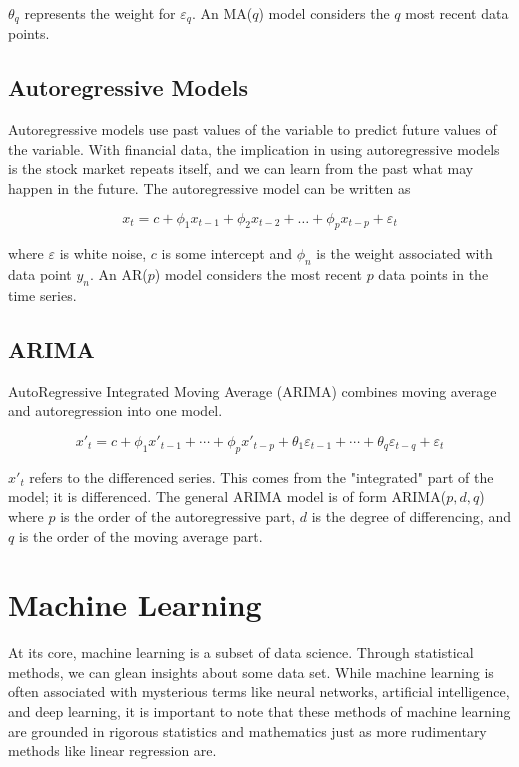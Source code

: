 \documentclass[12pt]{article}
\begin{document}
$\theta_q$ represents the weight for $\varepsilon_q$. An MA($q$) model considers the $q$ most recent data points. \cite[8.4]{forecasting}


\subsection{Autoregressive Models}
Autoregressive models use past values of the variable to predict future values of the variable. With financial data, the implication in using autoregressive models is the stock market repeats itself, and we can learn from the past what may happen in the future. \cite[8.3]{forecasting} The autoregressive model can be written as 

$$x_{t} = c + \phi_{1}x_{t-1} + \phi_{2}x_{t-2} + \dots + \phi_{p}x_{t-p} + \varepsilon_{t}$$

where $\varepsilon$ is white noise, $c$ is some intercept and $\phi_n$ is the weight associated with data point $y_n$. An AR($p$) model considers the most recent $p$ data points in the time series.

\subsection{ARIMA}
AutoRegressive Integrated Moving Average (ARIMA) combines moving average and autoregression into one model. 

$$ x'_{t} = c + \phi_{1}x'_{t-1} + \cdots + \phi_{p}x'_{t-p} + \theta_{1}\varepsilon_{t-1} + \cdots + \theta_{q}\varepsilon_{t-q} + \varepsilon_{t} $$

$x'_t$ refers to the differenced series. This comes from the "integrated" part of the model; it is differenced. The general ARIMA model is of form ARIMA($p,d,q$) where $p$ is the order of the autoregressive part, $d$ is the degree of differencing, and $q$ is the order of the moving average part. \cite[8.5]{forecasting}



\section{Machine Learning} 
At its core, machine learning is a subset of data science. Through statistical methods, we can glean insights about some data set. While machine learning is often associated with mysterious terms like neural networks, artificial intelligence, and deep learning, it is important to note that these methods of machine learning are grounded in rigorous statistics and mathematics just as more rudimentary methods like linear regression are.
\end{document}
